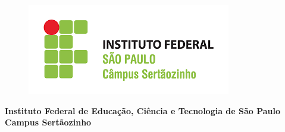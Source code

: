 \documentclass[
	12pt,				%
	openright,			%
	oneside,			%
	a4paper,			%
	chapter=TITLE,		%
	english,			%
	brazil				%
	]{abntex2}
\begin{document}
    \label{sec:README}
    
    \newpage
    

    \frenchspacing %
    
    
    \begin{figure}[H]
        \centering
        \includegraphics[scale=0.45]{Figuras/IFSP.png}
        \label{fig:logoIFSP}
    \end{figure}
    
    \vspace{-1cm}
    
    \begin{center}
        \textbf{\sffamily\large Instituto Federal de Educação, Ciência e Tecnologia de São Paulo \\ Campus Sertãozinho}
    \end{center}
    
    \vspace{3cm}
    
    \imprimircapa
    
    \imprimirfolhaderosto*{} %
    
    
    
    
    
    
    
\end{document}
